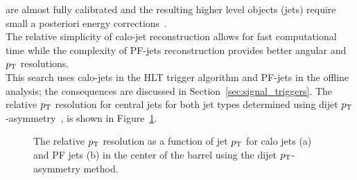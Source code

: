 are almost fully calibrated and the resulting higher level objects (jets) require small a posteriori 
energy corrections~\cite{Chatrchyan:2011ds}.\\
\indent The relative simplicity of calo-jet reconstruction allows for fast computational time while 
the complexity of PF-jets reconstruction provides better angular and $p_{\mathrm{T}}$ resolutions. \\
\indent This search uses calo-jets in the HLT trigger algorithm and PF-jets in the offline analysis; the consequences are 
discussed in Section~\ref{sec:signal_triggers}. The relative $p_{\mathrm{T}}$ resolution for central jets for both 
jet types determined using dijet $p_{\mathrm{T}}$-asymmetry~\cite{CMS-PAS-JME-10-014}, is shown in Figure~\ref{fig:jetRes}. 

\begin{figure}[h!]
  \begin{center}
      \caption{\label{fig:jetRes} The relative $p_{\mathrm{T}}$ resolution as a function of jet $p_{\mathrm{T}}$
              for calo jets (a) and PF jets (b) in the center of the barrel using the dijet
              $p_{\mathrm{T}}$-asymmetry method.}
  \end{center}
\end{figure}

%
